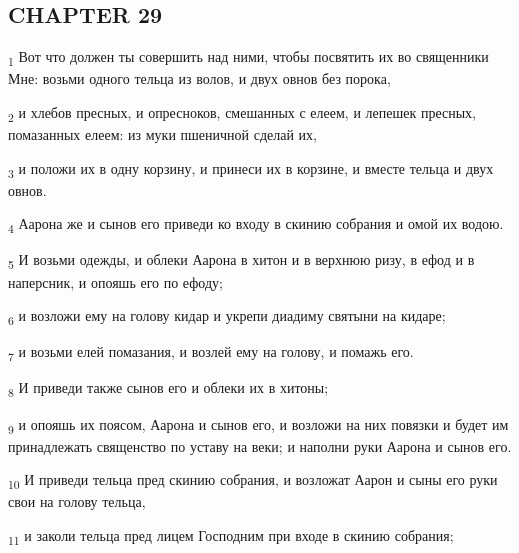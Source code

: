 \subsection{CHAPTER 29}
\begin{tcolorbox}
\textsubscript{1} Вот что должен ты совершить над ними, чтобы посвятить их во священники Мне: возьми одного тельца из волов, и двух овнов без порока,
\end{tcolorbox}
\begin{tcolorbox}
\textsubscript{2} и хлебов пресных, и опресноков, смешанных с елеем, и лепешек пресных, помазанных елеем: из муки пшеничной сделай их,
\end{tcolorbox}
\begin{tcolorbox}
\textsubscript{3} и положи их в одну корзину, и принеси их в корзине, и вместе тельца и двух овнов.
\end{tcolorbox}
\begin{tcolorbox}
\textsubscript{4} Аарона же и сынов его приведи ко входу в скинию собрания и омой их водою.
\end{tcolorbox}
\begin{tcolorbox}
\textsubscript{5} И возьми одежды, и облеки Аарона в хитон и в верхнюю ризу, в ефод и в наперсник, и опояшь его по ефоду;
\end{tcolorbox}
\begin{tcolorbox}
\textsubscript{6} и возложи ему на голову кидар и укрепи диадиму святыни на кидаре;
\end{tcolorbox}
\begin{tcolorbox}
\textsubscript{7} и возьми елей помазания, и возлей ему на голову, и помажь его.
\end{tcolorbox}
\begin{tcolorbox}
\textsubscript{8} И приведи также сынов его и облеки их в хитоны;
\end{tcolorbox}
\begin{tcolorbox}
\textsubscript{9} и опояшь их поясом, Аарона и сынов его, и возложи на них повязки и будет им принадлежать священство по уставу на веки; и наполни руки Аарона и сынов его.
\end{tcolorbox}
\begin{tcolorbox}
\textsubscript{10} И приведи тельца пред скинию собрания, и возложат Аарон и сыны его руки свои на голову тельца,
\end{tcolorbox}
\begin{tcolorbox}
\textsubscript{11} и заколи тельца пред лицем Господним при входе в скинию собрания;
\end{tcolorbox}
